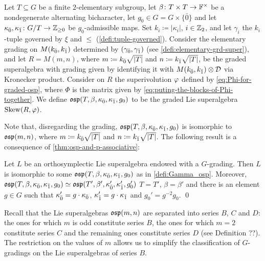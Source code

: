 \begin{defi}\label{defi:Gamma_osp}
    Let $T \subseteq G$ be a finite $2$-elementary subgroup, let $\beta\colon {T\times T} \to \mathbb{F}^\times$ be a nondegenerate alternating bicharacter, let $g_0 \in G = G\times \{ \bar 0 \}$ and let $\kappa_{\bar{0}}, \kappa_{\bar{1}} \colon G/T \to \mathbb{Z}_{\geq 0}$ be $g_0$-admissible maps. 
    Set $k_i \coloneqq |\kappa_i|$, $i\in \mathbb{Z}_2$, and let $\gamma_i$ the $k_i$-tuple governed by $\xi$ and $\leq$ (\cref{defi:tuple-governed}). 
    Consider the elementary grading on $M(k_{\bar{0}}, k_{\bar{1}})$ determined by $(\gamma_{\bar{0}}, \gamma_{\bar{1}})$ (see \cref{defi:elementary-grd-super}), and let $R = M(m,n)$, where $m \coloneqq k_{\bar{0}} \sqrt{|T|}$ and $n \coloneqq k_{\bar{1}} \sqrt{|T|}$, be the graded superalgebra with grading given by identifying it with $M(k_{\bar{0}}, k_{\bar{1}}) \otimes \mathcal{D}$ via Kronecker product. 
    Consider on $R$ the superivolution $\varphi$ defined by \cref{eq:Phi-for-graded-osp}, where $\Phi$ is the matrix given by \cref{eq:puting-the-blocks-of-Phi-together}. 
    We define $\mathfrak{osp}(T, \beta, \kappa_{\bar{0}}, \kappa_{\bar{1}}, g_0)$ to be the graded Lie superalgebra $\operatorname{Skew}(R, \varphi)$. 
\end{defi}

Note that, disregarding the grading, $\mathfrak{osp}(T, \beta, \kappa_{\bar{0}}, \kappa_{\bar{1}}, g_0)$ is isomorphic to $\mathfrak{osp}(m,n)$, where $m \coloneqq k_{\bar{0}} \sqrt{|T|}$ and $n \coloneqq k_{\bar{1}} \sqrt{|T|}$.
The following result is a consequence of \cref{thm:osp-and-p-associative}:

\begin{thm}\label{thm:grds-osp-final}
    Let $L$ be an orthosymplectic Lie superalgebra endowed with a $G$-grading. 
    Then $L$ is isomorphic to some $\mathfrak{osp}(T, \beta, \kappa_{\bar{0}}, \kappa_{\bar{1}}, g_0)$ as in \cref{defi:Gamma_osp}. 
    Moreover, $\mathfrak{osp}(T, \beta, \kappa_{\bar{0}}, \kappa_{\bar{1}}, g_0) \simeq \mathfrak{osp}(T', \beta', \kappa_{\bar{0}}', \kappa_{\bar{1}}', g_0')$ \IFF $T =T'$, $\beta = \beta'$ and there is an element $g \in G$ such that $\kappa_{\bar{0}}' = g\cdot\kappa_{\bar{0}}$, $\kappa_{\bar{1}}' = g\cdot\kappa_{\bar{1}}$ and $g_0' = g^{-2}g_0$. \qed
\end{thm}

Recall that the Lie superalgebras $\mathfrak{osp}(m,n)$ are separated into series $B$, $C$ and $D$: the ones for which $m$ is odd constitute series $B$, the ones for which $m = 2$ constitute series $C$ and the remaining ones constitute series $D$ (see Definition ??). 
The restriction on the values of $m$ allows us to simplify the classification of $G$-gradings on the Lie superalgebras of series $B$. 


